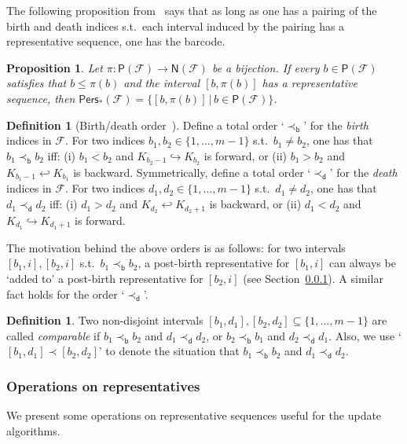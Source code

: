 \documentclass[letterpaper,11pt]{article}
\theoremstyle{mythmstyle}
\newtheorem{proposition}[theorem]{Proposition}
\theoremstyle{mydefstyle}
\newtheorem{definition}{Definition}
\theoremstyle{plain}
\newtheorem{proposition}[theorem]{Proposition}
\theoremstyle{definition}
\newtheorem{definition}[theorem]{Definition}
\newcommand{\Pers}{\mathsf{Pers}}
\newcommand{\pinds}{\mathsf{P}}
\newcommand{\ninds}{\mathsf{N}}
\newcommand{\<}[1]{\langle #1\rangle}
\newcommand{\incto}{\hookrightarrow}
\newcommand{\bakincto}{\hookleftarrow}
\newcommand{\given}{\,|\,}
\newcommand{\Set}[1]{\{#1\}}
\newcommand{\Fcal}{\mathcal{F}}
\newcommand{\filtcnt}{m}
\newcommand{\bles}{\prec_{\mathsf{b}}}
\newcommand{\dles}{\prec_{\mathsf{d}}}
\newcommand{\iles}{\prec}
\newcommand{\defemph}[1]{{\textit{#1}}}
\begin{document}
The following proposition from~\cite{dey2021graph} 
says that as long as 
one has a pairing of the birth and death indices s.t.\ each interval
induced by the pairing has a representative sequence,
one has the barcode.

\begin{proposition}\label{prop:pn-paring-w-rep}
Let $\pi:\pinds(\Fcal)\to\ninds(\Fcal)$ be a bijection.
If every $b\in\pinds(\Fcal)$ satisfies that $b\leq\pi(b)$ and the interval $[b,\pi(b)]$
has a representative sequence,
then $\Pers_*(\Fcal)=\Set{[b,\pi(b)]\given b\in\pinds(\Fcal)}$.
\end{proposition}


\begin{definition}[Birth/death order~\cite{maria2014zigzag}]
\label{dfn:bd-ordere}
Define a total order `$\bles$' for the \defemph{birth} indices in $\Fcal$.
For two indices $b_1,b_2\in \Set{1,\ldots,\filtcnt-1}$
s.t.\ $b_1\neq b_2$,
one has that
$b_1\bles b_2$
iff:
    (i)
    $b_1<b_2$ and 
    $K_{b_2-1}\incto K_{b_2}$ is forward,
    or (ii) $b_1>b_2$ and 
    $K_{b_1-1}\bakincto K_{b_1}$ is backward.
Symmetrically,
define a total order `$\dles$' for the \defemph{death} indices in $\Fcal$.
For two indices $d_1,d_2\in \Set{1,\ldots,\filtcnt-1}$
s.t.\ $d_1\neq d_2$,
one has that $d_1\dles d_2$
iff:
    (i)
    $d_1>d_2$ and 
    $K_{d_2}\bakincto K_{d_2+1}$ is backward,
    or (ii) $d_1<d_2$ and 
    $K_{d_1}\incto K_{d_1+1}$ is forward.
\end{definition}
The motivation behind the above orders is as follows:
for two intervals $[b_1,i],[b_2,i]$ s.t.\ $b_1\bles b_2$,
a post-birth representative for $[b_1,i]$ can always be
`added to' a post-birth representative for $[b_2,i]$ (see Section~\ref{sec:rep-oper}).
A similar fact holds for the order `$\dles$'.

\begin{definition}
Two non-disjoint intervals $[b_1,d_1],[b_2,d_2]\subseteq\Set{1,\ldots,\filtcnt-1}$ %
are called \defemph{comparable} if $b_1\bles b_2$ and $d_1\dles d_2$,
or $b_2\bles b_1$ and $d_2\dles d_1$.
Also, we use `$[b_1,d_1]\iles [b_2,d_2]$' to denote the situation
that $b_1\bles b_2$ and $d_1\dles d_2$.
\end{definition}

\subsubsection{Operations on representatives}
\label{sec:rep-oper}

We present some operations on representative sequences useful for 
the update algorithms.
\end{document}
